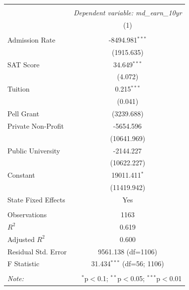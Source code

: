 \begin{table}[!htbp] \centering
\begin{tabular}{@{\extracolsep{5pt}}lc}
\\[-1.8ex]\hline
\hline \\[-1.8ex]
& \multicolumn{1}{c}{\textit{Dependent variable: md_earn_10yr}} \
\cr \cline{2-2}
\\[-1.8ex] & (1) \\
\hline \\[-1.8ex]
 Admission Rate & -8494.981$^{***}$ \\
& (1915.635) \\
 SAT Score & 34.649$^{***}$ \\
& (4.072) \\
 Tuition & 0.215$^{***}$ \\
& (0.041) \\
 Pell Grant %
& (3239.688) \\
 Private Non-Profit & -5654.596$^{}$ \\
& (10641.969) \\
 Public University & -2144.227$^{}$ \\
& (10622.227) \\
 Constant & 19011.411$^{*}$ \\
& (11419.942) \\
 State Fixed Effects & Yes \\
\hline \\[-1.8ex]
 Observations & 1163 \\
 $R^2$ & 0.619 \\
 Adjusted $R^2$ & 0.600 \\
 Residual Std. Error & 9561.138 (df=1106) \\
 F Statistic & 31.434$^{***}$ (df=56; 1106) \\
\hline
\hline \\[-1.8ex]
\textit{Note:} & \multicolumn{1}{r}{$^{*}$p$<$0.1; $^{**}$p$<$0.05; $^{***}$p$<$0.01} \\
\end{tabular}
\end{table}
